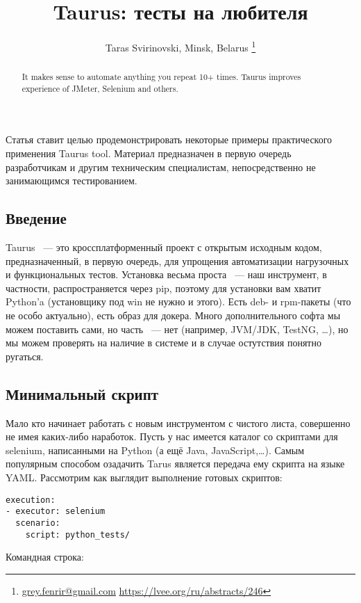 \documentclass[10pt, a5paper]{article}
\begin{document}
\title{Taurus: тесты на любителя}
\author{Taras Svirinovski, Minsk, Belarus \footnote{\url{grey.fenrir@gmail.com} \url {https://lvee.org/ru/abstracts/246}}}
\maketitle
\begin{abstract}
It makes sense to automate anything you repeat 10+ times.
Taurus improves experience of JMeter, Selenium and others.
\end{abstract}
Статья ставит целью продемонстрировать некоторые примеры \linebreak практического применения Taurus tool. Материал предназначен в первую очередь разработчикам и другим техническим специалистам, непосредственно не занимающимся тестированием.

\subsection*{Введение}

Taurus ~--- это кроссплатформенный проект с открытым исходным кодом, предназначенный, в первую очередь, для упрощения автоматизации нагрузочных и функциональных тестов.
Установка весьма проста ~--- наш инструмент, в частности, распространяется через pip, поэтому для установки вам хватит Python'a (установщику под win не нужно и этого). Есть deb- и rpm-пакеты (что не особо актуально), есть образ для докера. 
Много дополнительного софта мы можем поставить сами, но часть ~--- нет (например, JVM/JDK, TestNG, \ldots{}), но мы можем проверять на наличие в системе и в случае остутствия понятно ругаться.

\subsection*{Минимальный скрипт}

Мало кто начинает работать с новым инструментом с чистого листа, совершенно не имея каких-либо наработок. Пусть у нас имеется каталог со скриптами для selenium, написанными на Python (а ещё Java, JavaScript,\ldots{}). Самым популярным способом озадачить Tarus является передача ему скрипта на языке YAML. Рассмотрим как выглядит выполнение готовых скриптов:

\begin{verbatim}
execution:
- executor: selenium
  scenario:
    script: python_tests/\end{verbatim}
Командная строка:
\end{document}
